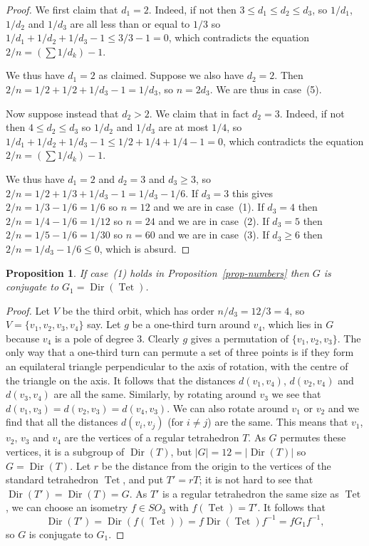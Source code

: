 \documentclass{amsart}
\DeclareMathOperator{\Tet}      {Tet}
\DeclareMathOperator{\Dir}      {Dir}
\renewcommand{\:}{\colon}
\newtheorem{proposition}[theorem]{Proposition}
\theoremstyle{definition}
\begin{document}
\begin{proof}
 We first claim that $d_1=2$.  Indeed, if not then
 $3\leq d_1\leq d_2\leq d_3$, so $1/d_1$, $1/d_2$ and $1/d_3$ are all
 less than or equal to $1/3$ so $1/d_1+1/d_2+1/d_3-1\leq 3/3-1=0$,
 which contradicts the equation $2/n=(\sum 1/d_k)-1$.

 We thus have $d_1=2$ as claimed.  Suppose we also have $d_2=2$.  Then
 $2/n=1/2+1/2+1/d_3-1=1/d_3$, so $n=2d_3$.  We are thus in case~(5).

 Now suppose instead that $d_2>2$.  We claim that in fact $d_2=3$.
 Indeed, if not then $4\leq d_2\leq d_3$ so $1/d_2$ and $1/d_3$ are at
 most $1/4$, so $1/d_1+1/d_2+1/d_3-1\leq 1/2+1/4+1/4-1=0$, which
 contradicts the equation $2/n=(\sum 1/d_k)-1$.

 We thus have $d_1=2$ and $d_2=3$ and $d_3\geq 3$, so
 $2/n=1/2+1/3+1/d_3-1=1/d_3-1/6$.  If $d_3=3$ this gives
 $2/n=1/3-1/6=1/6$ so $n=12$ and we are in case~(1).  If $d_3=4$ then
 $2/n=1/4-1/6=1/12$ so $n=24$ and we are in case~(2).  If $d_3=5$ then
 $2/n=1/5-1/6=1/30$ so $n=60$ and we are in case~(3).  If $d_3\geq 6$
 then $2/n=1/d_3-1/6\leq 0$, which is absurd.
\end{proof}

\begin{proposition}\label{prop-class-tet}
 If case~(1) holds in Proposition~\ref{prop-numbers} then $G$ is
 conjugate to $G_1=\Dir(\Tet)$.
\end{proposition}
\begin{proof}
 Let $V$ be the third orbit, which has order $n/d_3=12/3=4$, so
 $V=\{v_1,v_2,v_3,v_4\}$ say.  Let $g$ be a one-third turn around
 $v_4$, which lies in $G$ because $v_4$ is a pole of degree $3$.
 Clearly $g$ gives a permutation of $\{v_1,v_2,v_3\}$.  The only way
 that a one-third turn can permute a set of three points is if they
 form an equilateral triangle perpendicular to the axis of rotation,
 with the centre of the triangle on the axis.
 It follows that the distances $d(v_1,v_4)$, $d(v_2,v_4)$
 and $d(v_3,v_4)$ are all the same.  Similarly, by rotating around
 $v_3$ we see that $d(v_1,v_3)=d(v_2,v_3)=d(v_4,v_3)$.  We can also
 rotate around $v_1$ or $v_2$ and we find that all the distances
 $d(v_i,v_j)$ (for $i\neq j$) are the same.  This means that $v_1$,
 $v_2$, $v_3$ and $v_4$ are the vertices of a regular tetrahedron $T$.
 As $G$ permutes these vertices, it is a subgroup of $\Dir(T)$, but
 $|G|=12=|\Dir(T)|$ so $G=\Dir(T)$.  Let $r$ be the distance from the
 origin to the vertices of the standard tetrahedron $\Tet$, and put
 $T'=rT$; it is not hard to see that $\Dir(T')=\Dir(T)=G$.  As $T'$ is
 a regular tetrahedron the same size as $\Tet$, we can choose an
 isometry $f\in SO_3$ with $f(\Tet)=T'$.  It follows that
 \[ \Dir(T')=\Dir(f(\Tet))=f\Dir(\Tet)f^{-1}=fG_1f^{-1}, \]
 so $G$ is conjugate to $G_1$.
\end{proof}
\end{document}
